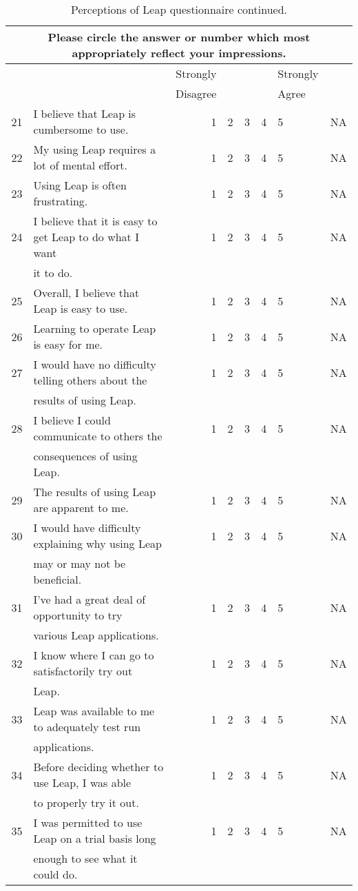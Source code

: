 \documentclass[11pt,times,dissertation,proposal]{uhthesis2e}
\begin{document}
\begin{table}[htbp]
  \caption{Perceptions of Leap questionnaire continued.}  
  \begin{tabular}{rlrccclc}\\
    \multicolumn{8}{c}{Please circle the answer or number which most
    appropriately reflect your impressions.} \\ \hline \hline
    &&Strongly&&&&Strongly&\\ 
    &&Disagree&&&&Agree&\\

    21&I believe that Leap is cumbersome to use.&1&2&3&4&5&NA\\ \hline
    22&My using Leap requires a lot of mental effort.&1&2&3&4&5&NA\\ \hline
    23&Using Leap is often frustrating.&1&2&3&4&5&NA\\ \hline
    24&I believe that it is easy to get Leap to do what I want&1&2&3&4&5&NA\\
    &it to do. \\ \hline
    25&Overall, I believe that Leap is easy to use.&1&2&3&4&5&NA\\ \hline
    26&Learning to operate Leap is easy for me.&1&2&3&4&5&NA\\ \hline \hline
    27&I would have no difficulty telling others about the &1&2&3&4&5&NA \\
    &results of using Leap. \\ \hline
    28&I believe I could communicate to others the &1&2&3&4&5&NA \\
    &consequences of using Leap. \\ \hline
    29&The results of using Leap are apparent to me.&1&2&3&4&5&NA\\ \hline
    30&I would have difficulty explaining why using Leap &1&2&3&4&5&NA\\
    &may or may not be beneficial.\\ \hline \hline
    31&I've had a great deal of opportunity to try &1&2&3&4&5&NA\\
    &various Leap applications. \\ \hline
    32&I know where I can go to satisfactorily try out&1&2&3&4&5&NA\\
    &Leap. \\ \hline
    33&Leap was available to me to adequately test run&1&2&3&4&5&NA\\
    &applications. \\ \hline
    34&Before deciding whether to use Leap, I was able &1&2&3&4&5&NA\\
    &to properly try it out.\\ \hline
    35&I was permitted to use Leap on a trial basis long &1&2&3&4&5&NA\\
    &enough to see what it could do. \\ \hline
    
  \end{tabular}
\end{table}
\end{document}
